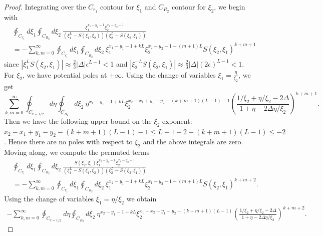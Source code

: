 \documentclass[a4paper,11pt]{article}
\theoremstyle{definition}
\begin{document}
\begin{proof}
Integrating over the $C_{r_1}$ contour for $\xi_1$ and $C_{R_2}$ contour for $\xi_2$, we begin with
\begin{equation}
    \begin{split}
        &\oint_{C_{r_1}}d\xi_1\oint_{C_{R_2}}d\xi_2 \ \frac{\xi_1^{x_1-y_1-1}\xi_2^{x_2-y_2-1}}{\left( \xi_1^L-S(\xi_1,\xi_2) \right)\left( \xi_2^L-S(\xi_2,\xi_1) \right)} \\
        &=-\sum_{k,m=0}^{\infty}\oint_{C_{r_1}}d\xi_1\oint_{C_{R_2}}d\xi_2 \ \xi_1^{x_1-y_1-1+kL}\xi_2^{x_2-y_2-1-(m+1)L}S(\xi_2,\xi_1)^{k+m+1} 
    \end{split}
\end{equation}
since $|\xi_1^LS(\xi_2,\xi_1)|\approx \frac23|\Delta|\epsilon^{L-1}< 1$ and $|\xi_2^{-L}S(\xi_2,\xi_1)|\approx \frac23|\Delta|(2\epsilon)^{L-1}< 1$. For $\xi_2$, we have potential poles at $+\infty$. Using the change of variables $\xi_1=\frac{\eta}{\xi_2}$, we get 
\begin{equation}
    \sum_{k,m=0}^{\infty}\oint_{C_{r=1/2}}d\eta\oint_{C_{R_2}}d\xi_2 \ \eta^{x_1-y_1-1+kL}\xi_2^{x_2-x_1+y_1-y_2-(k+m+1)(L-1)-1}\left(\frac{1/\xi_2+\eta/\xi_2-2\Delta}{1+\eta-2\Delta\eta/\xi_2}\right)^{k+m+1}.
\end{equation}
Then we have the following upper bound on the $\xi_2$ exponent: $x_2-x_1+y_1-y_2-(k+m+1)(L-1)-1\leq L-1-2-(k+m+1)(L-1) \leq -2$. Hence there are no poles with respect to $\xi_2$ and the above integrals are zero. Moving along, we compute the permuted terms
\begin{equation}
    \begin{split}
        &\oint_{C_{r_1}}d\xi_1\oint_{C_{R_2}}d\xi_2 \ \frac{S(\xi_2,\xi_1)\xi_1^{x_2-y_1-1}\xi_2^{x_1-y_2-1}}{\left( \xi_1^L-S(\xi_1,\xi_2) \right)\left( \xi_2^L-S(\xi_2,\xi_1) \right)} \\
        &=-\sum_{k,m=0}^\infty\oint_{C_{r_1}}d\xi_1\oint_{C_{R_2}}d\xi_2 \ \xi_1^{x_2-y_1-1+kL}\xi_2^{x_1-y_2-1-(m+1)L}S(\xi_2,\xi_1)^{k+m+2}.
    \end{split}
\end{equation}
 Using the change of variables $\xi_1=\eta/\xi_2$ we obtain
 \begin{equation}
     \begin{split}
         -\sum_{k,m=0}^\infty\oint_{C_{r=1/2}}d\eta\oint_{C_{R_2}}d\xi_2 \ \eta^{x_2-y_1-1+kL}\xi_2^{x_1-x_2+y_1-y_2-(k+m+1)(L-1)}\left(\frac{1/\xi_2+\eta/\xi_2-2\Delta}{1+\eta-2\Delta\eta/\xi_2}\right)^{k+m+2}.
     \end{split}
 \end{equation}

\end{proof}
\end{document}
